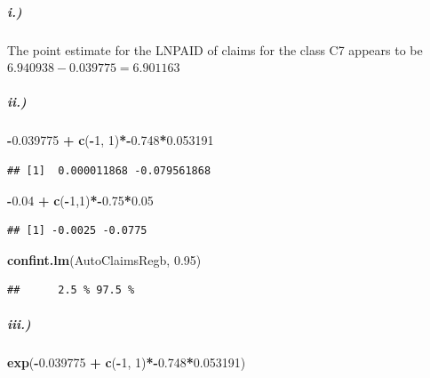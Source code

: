 \documentclass[
]{article}
\newenvironment{Shaded}{\begin{snugshade}}{\end{snugshade}}
\newcommand{\DecValTok}[1]{\textcolor[rgb]{0.00,0.00,0.81}{#1}}
\newcommand{\FloatTok}[1]{\textcolor[rgb]{0.00,0.00,0.81}{#1}}
\newcommand{\FunctionTok}[1]{\textcolor[rgb]{0.13,0.29,0.53}{\textbf{#1}}}
\newcommand{\NormalTok}[1]{#1}
\newcommand{\SpecialCharTok}[1]{\textcolor[rgb]{0.81,0.36,0.00}{\textbf{#1}}}
\begin{document}
\subparagraph{i.)}\label{i.}

The point estimate for the LNPAID of claims for the class C7 appears to
be \(6.940938-0.039775=6.901163\)

\subparagraph{ii.)}\label{ii.}

\begin{Shaded}
\begin{Highlighting}[]
\SpecialCharTok{{-}}\FloatTok{0.039775} \SpecialCharTok{+} \FunctionTok{c}\NormalTok{(}\SpecialCharTok{{-}}\DecValTok{1}\NormalTok{, }\DecValTok{1}\NormalTok{)}\SpecialCharTok{*{-}}\FloatTok{0.748}\SpecialCharTok{*}\FloatTok{0.053191}
\end{Highlighting}
\end{Shaded}

\begin{verbatim}
## [1]  0.000011868 -0.079561868
\end{verbatim}

\begin{Shaded}
\begin{Highlighting}[]
\SpecialCharTok{{-}}\FloatTok{0.04} \SpecialCharTok{+} \FunctionTok{c}\NormalTok{(}\SpecialCharTok{{-}}\DecValTok{1}\NormalTok{,}\DecValTok{1}\NormalTok{)}\SpecialCharTok{*{-}}\FloatTok{0.75}\SpecialCharTok{*}\FloatTok{0.05}
\end{Highlighting}
\end{Shaded}

\begin{verbatim}
## [1] -0.0025 -0.0775
\end{verbatim}

\begin{Shaded}
\begin{Highlighting}[]
\FunctionTok{confint.lm}\NormalTok{(AutoClaimsRegb, }\FloatTok{0.95}\NormalTok{)}
\end{Highlighting}
\end{Shaded}

\begin{verbatim}
##      2.5 % 97.5 %
\end{verbatim}

\subparagraph{iii.)}\label{iii.}

\begin{Shaded}
\begin{Highlighting}[]
\FunctionTok{exp}\NormalTok{(}\SpecialCharTok{{-}}\FloatTok{0.039775} \SpecialCharTok{+} \FunctionTok{c}\NormalTok{(}\SpecialCharTok{{-}}\DecValTok{1}\NormalTok{, }\DecValTok{1}\NormalTok{)}\SpecialCharTok{*{-}}\FloatTok{0.748}\SpecialCharTok{*}\FloatTok{0.053191}\NormalTok{)}
\end{Highlighting}
\end{Shaded}
\end{document}
